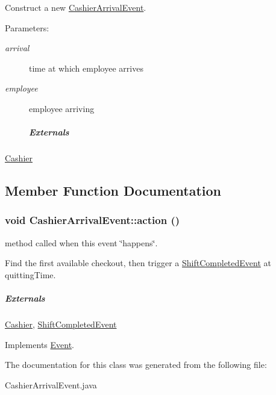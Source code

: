 Construct a new \hyperlink{class_cashier_arrival_event}{CashierArrivalEvent}. 

\begin{Desc}
\item[Parameters:]
\begin{description}
\item[{\em arrival}]time at which employee arrives \item[{\em employee}]employee arriving \subparagraph*{Externals}\end{description}
\end{Desc}
\hyperlink{class_cashier}{Cashier} 

\subsection{Member Function Documentation}
\hypertarget{class_cashier_arrival_event_f3bf40e4e3915f54eb9a24ac816ed0cb}{
\subsubsection[{action}]{\setlength{\rightskip}{0pt plus 5cm}void CashierArrivalEvent::action ()}}
\label{class_cashier_arrival_event_f3bf40e4e3915f54eb9a24ac816ed0cb}


method called when this event \char`\"{}happens\char`\"{}. 

Find the first available checkout, then trigger a \hyperlink{class_shift_completed_event}{ShiftCompletedEvent} at quittingTime. \subparagraph*{Externals}

\hyperlink{class_cashier}{Cashier}, \hyperlink{class_shift_completed_event}{ShiftCompletedEvent} 

Implements \hyperlink{class_event_fea360b9a95713e43cf3f9fa44150074}{Event}.

The documentation for this class was generated from the following file:\begin{CompactItemize}
\item 
CashierArrivalEvent.java\end{CompactItemize}
